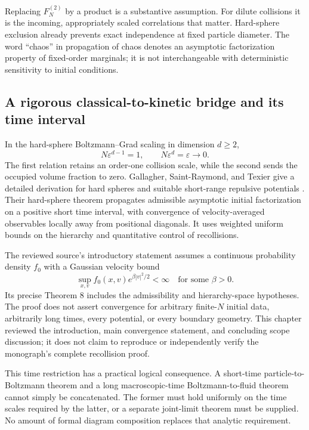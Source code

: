 Replacing $F_N^{(2)}$ by a product is a substantive assumption.
For dilute collisions it is the incoming, appropriately scaled
correlations that matter.  Hard-sphere exclusion already prevents exact
independence at fixed particle diameter.  The word ``chaos'' in
propagation of chaos denotes an asymptotic factorization property of
fixed-order marginals; it is not interchangeable with deterministic
sensitivity to initial conditions.

\subsection{A rigorous classical-to-kinetic bridge and its time interval}

In the hard-sphere Boltzmann--Grad scaling in dimension $d\ge2$,
\[
 N\varepsilon^{d-1}=1,
 \qquad N\varepsilon^d=\varepsilon\longrightarrow0.
\]
The first relation retains an order-one collision scale, while the
second sends the occupied volume fraction to zero.  Gallagher,
Saint-Raymond, and Texier give a detailed derivation for hard spheres
and suitable short-range repulsive potentials
\citep{microGallagher2013}.  Their hard-sphere theorem propagates
admissible asymptotic initial factorization on a positive short time
interval, with convergence of velocity-averaged observables locally
away from positional diagonals.  It uses weighted uniform bounds on
the hierarchy and quantitative control of recollisions.

The reviewed source's introductory statement assumes a continuous
probability density $f_0$ with a Gaussian velocity bound
\[
 \sup_{x,v}f_0(x,v)e^{\beta|v|^2/2}<\infty
 \quad\text{for some }\beta>0.
\]
Its precise Theorem 8 includes the admissibility and hierarchy-space
hypotheses.  The proof does not assert convergence for arbitrary
finite-$N$ initial data, arbitrarily long times, every potential, or
every boundary geometry.  This chapter reviewed the introduction,
main convergence statement, and concluding scope discussion; it does
not claim to reproduce or independently verify the monograph's complete
recollision proof.

This time restriction has a practical logical consequence.  A short-time
particle-to-Boltzmann theorem and a long macroscopic-time
Boltzmann-to-fluid theorem cannot simply be concatenated.  The former
must hold uniformly on the time scales required by the latter, or a
separate joint-limit theorem must be supplied.  No amount of formal
diagram composition replaces that analytic requirement.

